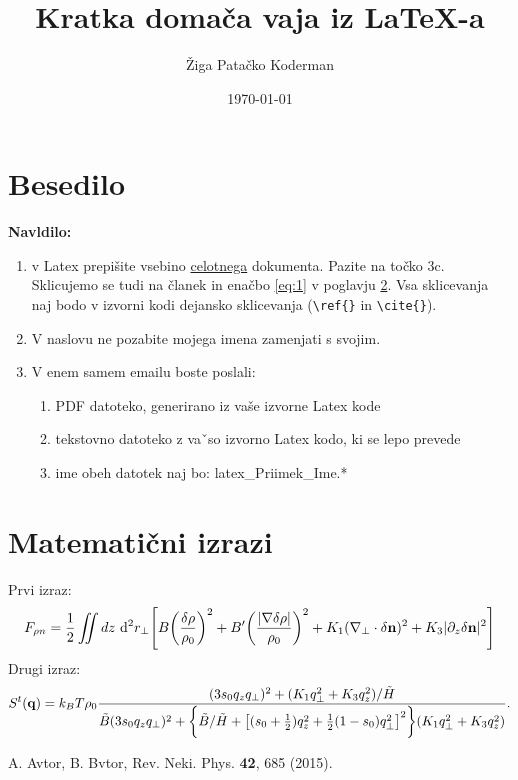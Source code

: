 \documentclass[11pt,a4paper]{article}
\begin{document}
\title{Kratka doma\v ca vaja iz \LaTeX-a}
\author{\v Ziga Pata\v cko Koderman}
\date{\today}

\maketitle
\section{Besedilo}
{\bf Navldilo:}
\begin{enumerate}
	\item v  Latex  prepi\v site  vsebino  \underline{celotnega}
dokumenta. Pazite na to\v cko 3c. Sklicujemo se tudi na \v clanek \cite{clanek} in ena\v cbo \ref{eq:1} v poglavju \ref{sec:izrazi}. Vsa sklicevanja naj bodo v izvorni kodi dejansko sklicevanja (\verb_\ref{}_ in \verb_\cite{}_).
	\item V naslovu ne pozabite mojega imena zamenjati s svojim.
	\item V enem samem emailu boste poslali:
	\begin{enumerate}
		\item PDF datoteko, generirano iz va\v se izvorne Latex kode
		\item tekstovno datoteko z vaˇso izvorno Latex kodo, ki se lepo prevede
		\item ime obeh datotek naj bo:  latex\_Priimek\_Ime.*
	\end{enumerate}
\end{enumerate}

\section{Matemati\v cni izrazi}\label{sec:izrazi}
Prvi izraz:
\begin{equation}\label{eq:1}
F_{\rho n} = \frac{1}{2} \int \!\!\!\! \int dz\ {\rm d}^2 r_\bot \Bigg[ B \bigg( \frac{\delta \rho}{\rho_0} \bigg)^2 + B'\bigg( \frac{ |\nabla \delta \rho| }{\rho_0} \bigg)^2 + K_1(\nabla_\bot \cdot \delta  \boldsymbol{{\rm n}})^2 + K_3 |\partial_z \delta \boldsymbol{{\rm n}}|^2 \Bigg]
\end{equation}
Drugi izraz:
$$
S^t (\boldsymbol{{\rm q}}) = k_B T \rho_0 \frac
{(3 s_0 q_z q_\bot)^2 + (K_1 q^2_\bot + K_3q^2_z) / \tilde{H}}
{\tilde{B} (3 s_0 q_z q_\bot)^2 + \bigg\{ \tilde{B} / \tilde{H} + \big[ (s_0 + \frac{1}{2})q_z^2 + \frac{1}{2}(1-s_0)q_\bot^2 \big]^2 \bigg\} (K_1q_\bot^2 + K_3q_z^2) } .
$$

\begin{thebibliography}{99}
	 A. Avtor, B. Bvtor, Rev. Neki. Phys. {\bf 42}, 685 (2015).
\end{thebibliography}
\end{document}
